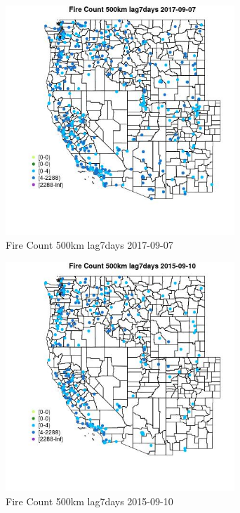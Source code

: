 \begin{figure} 
\centering  
\includegraphics[width=0.77\textwidth]{Code_Outputs/Report_ML_input_PM25_Step4_part_e_de_duplicated_aves_compiled_2019-05-21wNAs_MapObsFire_Count_500km_lag7days2017-09-07.jpg} 
\caption{\label{fig:Report_ML_input_PM25_Step4_part_e_de_duplicated_aves_compiled_2019-05-21wNAsMapObsFire_Count_500km_lag7days2017-09-07}Fire Count 500km lag7days 2017-09-07} 
\end{figure} 
 

\begin{figure} 
\centering  
\includegraphics[width=0.77\textwidth]{Code_Outputs/Report_ML_input_PM25_Step4_part_e_de_duplicated_aves_compiled_2019-05-21wNAs_MapObsFire_Count_500km_lag7days2015-09-10.jpg} 
\caption{\label{fig:Report_ML_input_PM25_Step4_part_e_de_duplicated_aves_compiled_2019-05-21wNAsMapObsFire_Count_500km_lag7days2015-09-10}Fire Count 500km lag7days 2015-09-10} 
\end{figure} 
 


